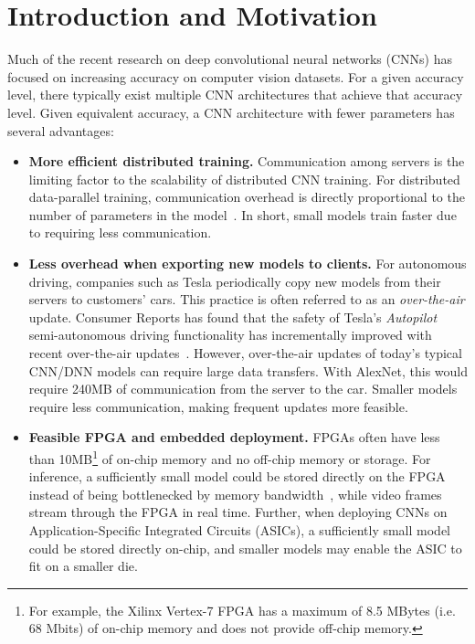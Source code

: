 \documentclass{article} \usepackage{iclr2017_conference,times}
\renewcommand{\cite}{\citep}
\def\vsp{\vspace{-0.15in}}
\begin{document}
\section{Introduction and Motivation}
\vsp
\label{sec:intro-ch5}
Much of the recent research on deep convolutional neural networks (CNNs) has focused on increasing accuracy on computer vision datasets.
For a given accuracy level, there typically exist multiple CNN architectures that achieve that accuracy level.
Given equivalent accuracy, a CNN architecture with fewer parameters has several advantages:
\begin{itemize}
	\setlength\itemsep{0in} \item[]{{\bf More efficient distributed training.} 
		Communication among servers is the limiting factor to the scalability of distributed CNN training.
		For distributed data-parallel training, communication overhead is directly proportional to the number of parameters in the model~\cite{FireCaffe}.
		In short, small models train faster due to requiring less communication.
	}
	
	\item[]{{\bf Less overhead when exporting new models to clients.} For autonomous driving, companies such as Tesla periodically copy new models from their servers to customers' cars. This practice is often referred to as an {\em over-the-air} update. Consumer Reports has found that the safety of Tesla's {\em Autopilot} semi-autonomous driving functionality has incrementally improved with recent over-the-air updates~\cite{ConsumerReports-Tesla}. However, over-the-air updates of today's typical CNN/DNN models can require large data transfers. With AlexNet, this would require 240MB of communication from the server to the car. Smaller models require less communication, making frequent updates more feasible.}
	
	\item[]{{\bf Feasible FPGA and embedded deployment.} FPGAs often have less than 10MB\footnote{For example, the Xilinx Vertex-7 FPGA has a maximum of 8.5 MBytes (i.e. 68 Mbits) of on-chip memory and does not provide off-chip memory.} of on-chip memory and no off-chip memory or storage. For inference, a sufficiently small model could be stored directly on the FPGA instead of being bottlenecked by memory bandwidth~\cite{fpga2016cnn}, while video frames stream through the FPGA in real time.
		Further, when deploying CNNs on Application-Specific Integrated Circuits (ASICs), a sufficiently small model could be stored directly on-chip, and smaller models may enable the ASIC to fit on a smaller die.}




\end{itemize}
\end{document}
